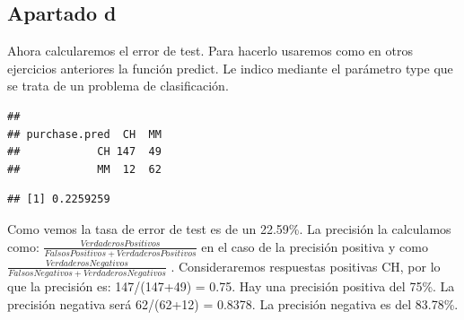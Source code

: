 \documentclass[]{article}
\newenvironment{Shaded}{\begin{snugshade}}{\end{snugshade}}
\newcommand{\KeywordTok}[1]{\textcolor[rgb]{0.13,0.29,0.53}{\textbf{{#1}}}}
\newcommand{\DataTypeTok}[1]{\textcolor[rgb]{0.13,0.29,0.53}{{#1}}}
\newcommand{\StringTok}[1]{\textcolor[rgb]{0.31,0.60,0.02}{{#1}}}
\newcommand{\CommentTok}[1]{\textcolor[rgb]{0.56,0.35,0.01}{\textit{{#1}}}}
\newcommand{\NormalTok}[1]{{#1}}
\begin{document}
\subsection{Apartado d}\label{apartado-d-1}

Ahora calcularemos el error de test. Para hacerlo usaremos como en otros
ejercicios anteriores la función predict. Le indico mediante el
parámetro type que se trata de un problema de clasificación.

\begin{Shaded}
\end{Shaded}

\begin{verbatim}
##              
## purchase.pred  CH  MM
##            CH 147  49
##            MM  12  62
\end{verbatim}

\begin{Shaded}
\end{Shaded}

\begin{verbatim}
## [1] 0.2259259
\end{verbatim}

Como vemos la tasa de error de test es de un 22.59\%. La precisión la
calculamos como:
\(\frac{VerdaderosPositivos}{FalsosPositivos+VerdaderosPositivos}\) en
el caso de la precisión positiva y como
\(\frac{VerdaderosNegativos}{FalsosNegativos + VerdaderosNegativos}\) .
Consideraremos respuestas positivas CH, por lo que la precisión es:
147/(147+49) = 0.75. Hay una precisión positiva del 75\%. La precisión
negativa será 62/(62+12) = 0.8378. La precisión negativa es del 83.78\%.
\end{document}
